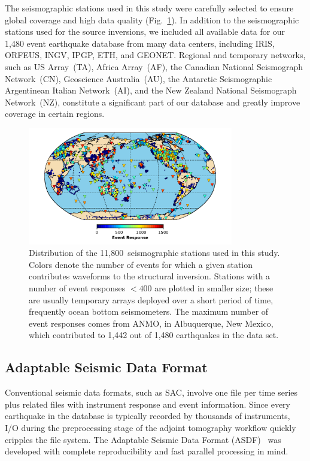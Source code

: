 The seismographic stations used in this study were carefully selected to ensure global coverage
and high data quality (Fig.~\ref{fig:stations}).
In addition to the seismographic  stations used for the source inversions,
we included all available data for our 1,480 event earthquake database from many data centers,
including IRIS, ORFEUS, INGV, IPGP, ETH, and GEONET.
Regional and temporary networks,
such as US Array~(TA),
Africa Array~(AF), the Canadian National Seismograph Network~(CN), Geoscience Australia~(AU),
the Antarctic Seismographic Argentinean Italian Network~(AI),
and the New Zealand National Seismograph Network~(NZ),
constitute a significant part
of our database and greatly improve coverage in certain regions.

\begin{figure}
  \includegraphics[width=0.8\textwidth]{ch-GLADM25/figures/station_map.pdf}
  \caption[Distribution of the seismographic stations]
  {\small{Distribution of the 11,800~seismographic stations used in this study. Colors denote the number of events for which a given station contributes waveforms to the structural inversion. Stations with a number of event responses $<400$ are plotted in smaller size; these are usually temporary arrays deployed over a short period of time, frequently ocean bottom seismometers. The maximum number of event responses comes from ANMO, in Albuquerque, New Mexico, which contributed to 1,442 out of 1,480 earthquakes in the data set.}}
  \label{fig:stations}
  \centering
\end{figure}

\subsection{Adaptable Seismic Data Format}
\label{section:ASDF}

Conventional seismic data formats, such as SAC, involve one file per time series
plus related files with instrument response and event information.
Since every earthquake in the database is typically recorded by thousands of
instruments, I/O during the preprocessing stage of the adjoint tomography workflow
quickly cripples the file system. The Adaptable Seismic Data Format
(ASDF)~\cite{krischer2016adaptable}
was developed with complete reproducibility and fast parallel processing in mind.

